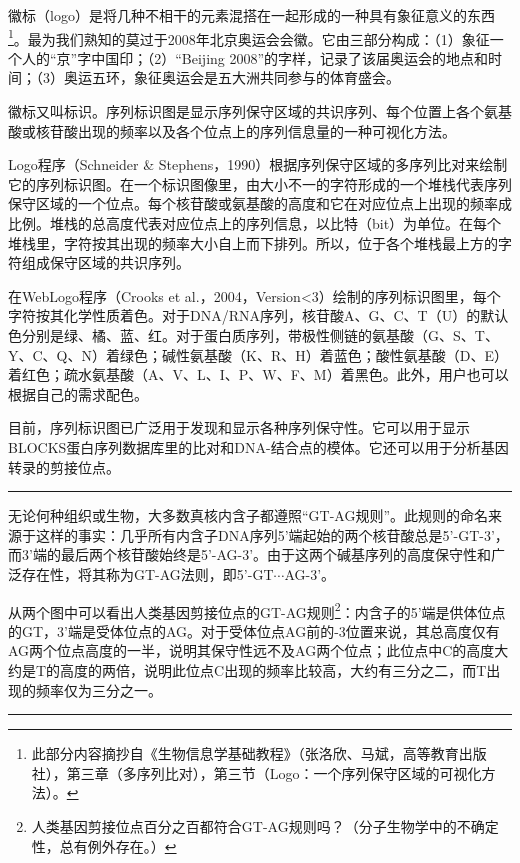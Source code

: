\documentclass[11pt,a4paper,twoside]{book}
\begin{document}
{\small
  徽标（logo）是将几种不相干的元素混搭在一起形成的一种具有象征意义的东西\footnote{此部分内容摘抄自《生物信息学基础教程》（张洛欣、马斌，高等教育出版社），第三章（多序列比对），第三节（Logo：一个序列保守区域的可视化方法）。}。最为我们熟知的莫过于2008年北京奥运会会徽。它由三部分构成：（1）象征一个人的“京”字中国印；（2）“Beijing 2008”的字样，记录了该届奥运会的地点和时间；（3）奥运五环，象征奥运会是五大洲共同参与的体育盛会。

徽标又叫标识。序列标识图是显示序列保守区域的共识序列、每个位置上各个氨基酸或核苷酸出现的频率以及各个位点上的序列信息量的一种可视化方法。

Logo程序（Schneider \& Stephens，1990）根据序列保守区域的多序列比对来绘制它的序列标识图。在一个标识图像里，由大小不一的字符形成的一个堆栈代表序列保守区域的一个位点。每个核苷酸或氨基酸的高度和它在对应位点上出现的频率成比例。堆栈的总高度代表对应位点上的序列信息，以比特（bit）为单位。在每个堆栈里，字符按其出现的频率大小自上而下排列。所以，位于各个堆栈最上方的字符组成保守区域的共识序列。

在WebLogo程序（Crooks et al.，2004，Version<3）绘制的序列标识图里，每个字符按其化学性质着色。对于DNA/RNA序列，核苷酸A、G、C、T（U）的默认色分别是绿、橘、蓝、红。对于蛋白质序列，带极性侧链的氨基酸（G、S、T、Y、C、Q、N）着绿色；碱性氨基酸（K、R、H）着蓝色；酸性氨基酸（D、E）着红色；疏水氨基酸（A、V、L、I、P、W、F、M）着黑色。此外，用户也可以根据自己的需求配色。

目前，序列标识图已广泛用于发现和显示各种序列保守性。它可以用于显示BLOCKS蛋白序列数据库里的比对和DNA-结合点的模体。它还可以用于分析基因转录的剪接位点。
}

\hrule height 3pt
\vspace{0.5cm}

无论何种组织或生物，大多数真核内含子都遵照“GT-AG规则”。此规则的命名来源于这样的事实：几乎所有内含子DNA序列5'端起始的两个核苷酸总是5'-GT-3'，而3'端的最后两个核苷酸始终是5'-AG-3'。由于这两个碱基序列的高度保守性和广泛存在性，将其称为GT-AG法则，即5'-GT$\cdots$AG-3'。

从两个图中可以看出人类基因剪接位点的GT-AG规则\footnote{人类基因剪接位点百分之百都符合GT-AG规则吗？（分子生物学中的不确定性，总有例外存在。）}：内含子的5'端是供体位点的GT，3'端是受体位点的AG。对于受体位点AG前的-3位置来说，其总高度仅有AG两个位点高度的一半，说明其保守性远不及AG两个位点；此位点中C的高度大约是T的高度的两倍，说明此位点C出现的频率比较高，大约有三分之二，而T出现的频率仅为三分之一。

\vspace{0.5cm}
\hrule height 3pt
\end{document}
